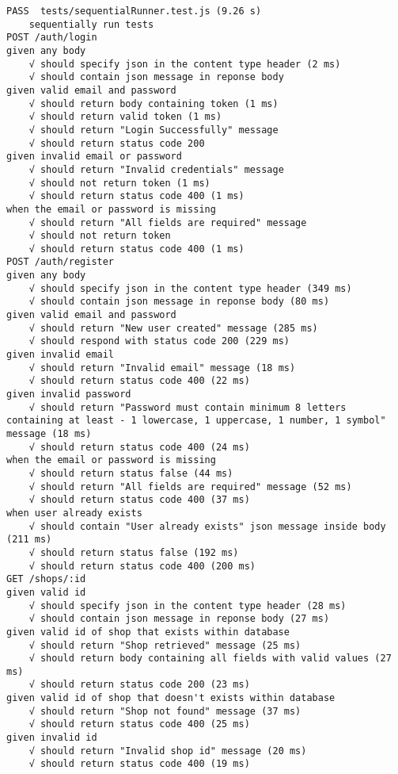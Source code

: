 \documentclass{article}
\begin{document}
        \begin{lstlisting}
PASS  tests/sequentialRunner.test.js (9.26 s)
    sequentially run tests
POST /auth/login
given any body
    √ should specify json in the content type header (2 ms)
    √ should contain json message in reponse body
given valid email and password
    √ should return body containing token (1 ms)
    √ should return valid token (1 ms)
    √ should return "Login Successfully" message
    √ should return status code 200
given invalid email or password
    √ should return "Invalid credentials" message
    √ should not return token (1 ms)
    √ should return status code 400 (1 ms)
when the email or password is missing
    √ should return "All fields are required" message
    √ should not return token
    √ should return status code 400 (1 ms)
POST /auth/register
given any body
    √ should specify json in the content type header (349 ms)
    √ should contain json message in reponse body (80 ms)
given valid email and password
    √ should return "New user created" message (285 ms)
    √ should respond with status code 200 (229 ms)
given invalid email
    √ should return "Invalid email" message (18 ms)
    √ should return status code 400 (22 ms)
given invalid password
    √ should return "Password must contain minimum 8 letters containing at least - 1 lowercase, 1 uppercase, 1 number, 1 symbol" message (18 ms)
    √ should return status code 400 (24 ms)
when the email or password is missing
    √ should return status false (44 ms)
    √ should return "All fields are required" message (52 ms)
    √ should return status code 400 (37 ms)
when user already exists
    √ should contain "User already exists" json message inside body (211 ms)
    √ should return status false (192 ms)
    √ should return status code 400 (200 ms)
GET /shops/:id
given valid id
    √ should specify json in the content type header (28 ms)
    √ should contain json message in reponse body (27 ms)
given valid id of shop that exists within database
    √ should return "Shop retrieved" message (25 ms)
    √ should return body containing all fields with valid values (27 ms)
    √ should return status code 200 (23 ms)
given valid id of shop that doesn't exists within database
    √ should return "Shop not found" message (37 ms)
    √ should return status code 400 (25 ms)
given invalid id
    √ should return "Invalid shop id" message (20 ms)
    √ should return status code 400 (19 ms)
        \end{lstlisting}
\end{document}
